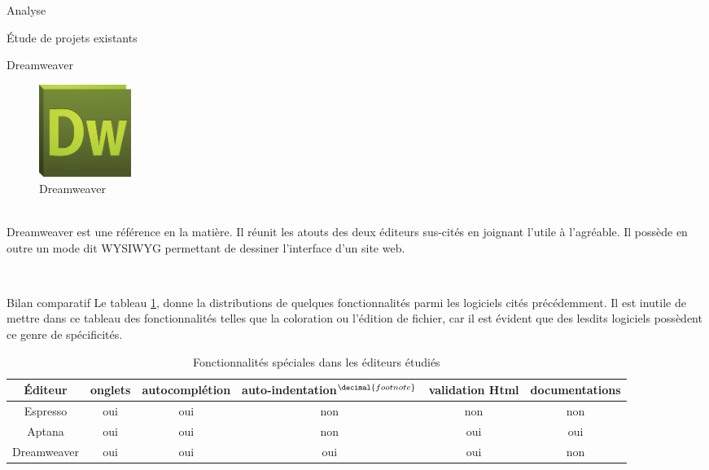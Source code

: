 \documentclass[a4paper, 12pt]{report}
\begin{document}
\begin{part}{Analyse}
\begin{chapter}{Étude de projets existants}
\begin{section}{Dreamweaver}
				\begin{figure}[h]
					\begin{center}
						\includegraphics[width=3cm]{images/logoDreamweaver.png}
						\caption{Dreamweaver}
					\end{center}
				\end{figure}~\\
				Dreamweaver est une référence en la matière. Il réunit les atouts des deux éditeurs sus-cités en joignant l'utile à l'agréable.
				Il possède en outre un mode dit \gls{WYSIWYG} permettant de dessiner l'interface d'un site web.
			\end{section}
			~\\


			\begin{section}{Bilan comparatif}
				Le tableau \ref{comparatif}, donne la distributions de quelques fonctionnalités parmi les logiciels cités précédemment. Il est
				inutile de mettre dans ce tableau des fonctionnalités telles que la coloration ou l'édition de fichier, car il est évident que des
				lesdits logiciels possèdent ce genre de spécificités.\\

				\addtocounter{footnote}{1}
				\begin{table}[h]
				\caption{\label{comparatif} Fonctionnalités spéciales dans les éditeurs étudiés}
					\begin{tabular}{|c||c|c|c|c|c|} %
					  \hline
					  Éditeur & onglets & autocomplétion & auto-indentation$^{\decimal{footnote}}$ & validation \gls{Html} & documentations \\
					  \hline

					  Espresso & oui & oui & non & non & non \\
					  Aptana & oui & oui & non & oui & oui \\
					  Dreamweaver & oui & oui & oui & oui & non \\
					  \hline
					\end{tabular}
				\end{table}


\end{section}
\end{chapter}
\end{part}
\end{document}
